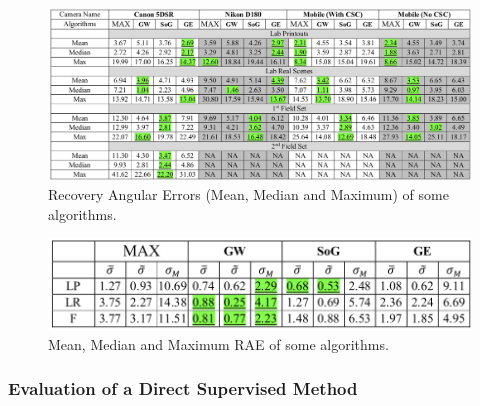 \begin{figure}[htbp]
    \centering
    \includegraphics[width = 1 \linewidth]{images/paper4/RAEHigh.png}
    \centering
    \caption{Recovery Angular Errors (Mean, Median and Maximum) of some algorithms.}
    \label{fig:RAE}
\end{figure}

\begin{figure}[htbp]
    \centering
    \includegraphics[width = 0.6 \linewidth]{images/paper4/standardHigh.png}
    \centering
    \caption{Mean, Median and Maximum RAE of some algorithms.}
    \label{fig:RAEstandard}
\end{figure}

\subsubsection{Evaluation of a Direct Supervised Method}

